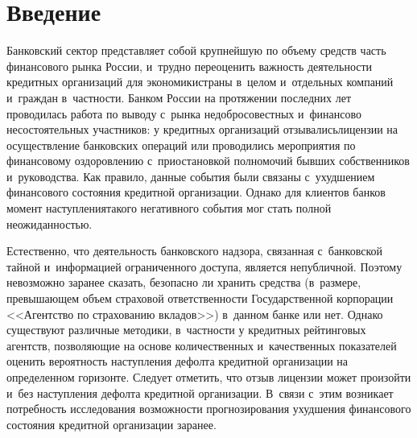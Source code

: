 
  
\vspace*{-3pt}



\thispagestyle{headings}

\begin{multicols}{2}

\label{st\stat}
     
      
\section{Введение }

Банковский сектор представляет собой крупнейшую по объему средств часть 
финансового рынка России, и~трудно переоценить важность деятельности 
кредитных организаций для экономики\linebreak страны в~целом и~отдельных 
компаний и~граждан в~частности. Банком России на протяжении последних 
лет проводилась работа по выводу с~рынка недобросовестных и~финансово 
несостоятельных участников: у кредитных организаций отзывались\linebreak лицензии 
на осуществление банковских операций или проводились мероприятия по 
финансовому оздо\-ров\-ле\-нию с~приостановкой полномочий бывших 
собственников и~руководства. Как правило, данные события были связаны 
с~ухудшением финансового состояния кредитной организации. Однако для 
клиентов банков момент наступления\linebreak такого негативного события мог стать 
полной неожиданностью. 

Естественно, что деятельность банковского %
надзора, связанная с~банковской тайной и~информацией ограниченного 
доступа, является не\-пуб\-лич\-ной. Поэтому невозможно заранее сказать, 
безопас\-но ли хранить средства (в~размере, превышающем объем страховой 
ответственности Государственной корпорации
<<Агентство по страхованию вкладов>>) в~данном банке или нет. Однако существуют 
раз\-личные методики, в~частности у кредитных рейтинговых агентств, 
позволяющие на основе количественных и~качественных показателей 
оценить вероятность наступления дефолта кредитной организации на 
определенном горизонте. Следует отметить, что отзыв лицензии может 
произойти и~без наступления дефолта кредитной организации. В~связи 
с~этим возникает потребность исследования возможности прогнозирования 
ухудшения финансового состояния кредитной организации заранее.


\end{multicols}
